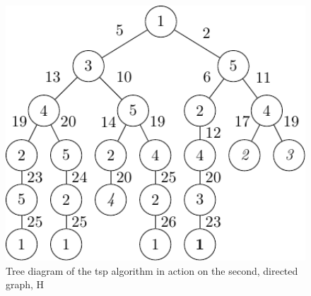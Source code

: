 \begin{figure}
\centering
\includegraphics[keepaspectratio,width=1.0\textwidth,height=0.35\textheight]{chapters/tsp/figs/ugraph-figure3}
\caption[Tree diagram of the  algorithm's operation on a directed graph]{\label{fig:tsp:dtree}Tree diagram of the \gls{tsp} algorithm in action on the second, directed graph, H}
\end{figure}

\begin{cpobjectsfloat}
\begin{cpobjects}
\end{cpobjects}
    \caption[Set of subcells from H in the \gls{tlc} at the initial state]{\label{objs:tsp:obj1d}Set of subcells from H in the \gls{tlc} at the initial state (those different from G are in bold)}
\end{cpobjectsfloat}

